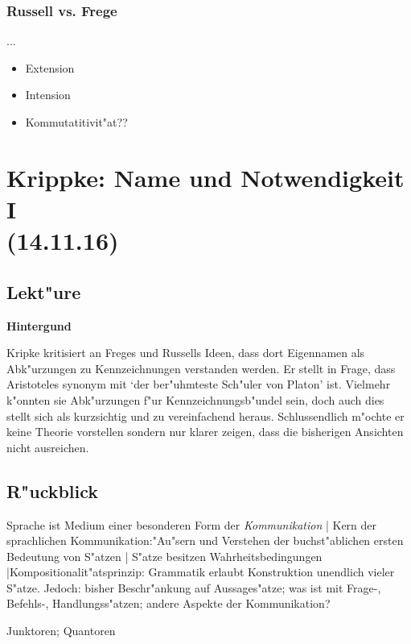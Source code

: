 \documentclass[emulatestandardclasses]{scrartcl}
\begin{document}
\subsubsection{Russell vs. Frege}

...

\begin{itemize}
  \item Extension
  \item Intension
  \item Kommutatitivit"at??
\end{itemize}

\section{Krippke: Name und Notwendigkeit I\\(14.11.16)}

\subsection{Lekt"ure}

\noindent\textbf{Hintergund}

Kripke kritisiert an Freges und Russells Ideen, dass dort Eigennamen als Abk"urzungen zu Kennzeichnungen verstanden werden. Er stellt in Frage, dass Aristoteles synonym mit `der ber"uhmteste Sch"uler von Platon' ist. Vielmehr k"onnten sie Abk"urzungen f"ur Kennzeichnungsb"undel sein, doch auch dies stellt sich als kurzsichtig und zu vereinfachend heraus. Schlussendlich m"ochte er keine Theorie vorstellen sondern nur klarer zeigen, dass die bisherigen Ansichten nicht ausreichen.\\

\subsection{R"uckblick}

\begin{description}[leftmargin=!,labelwidth=\widthof{\bfseries (B)}]
    \item[Bild der Sprache] Sprache ist Medium einer besonderen Form der \emph{Kommunikation} | Kern der sprachlichen Kommunikation:"Au"sern und Verstehen der buchst"ablichen ersten Bedeutung von S"atzen | S"atze besitzen Wahrheitsbedingungen |Kompositionalit"atsprinzip: Grammatik erlaubt Konstruktion unendlich vieler S"atze. Jedoch: bisher Beschr"ankung auf Aussages"atze; was ist mit Frage-, Befehls-, Handlungss"atzen; andere Aspekte der Kommunikation?
    \item[Ausdruckarten] Junktoren; Quantoren
    \item[a priori] 
    \item[a posteriori] 
    \item[kontingent] 
    \item[notwendig]
\end{description}
\end{document}
